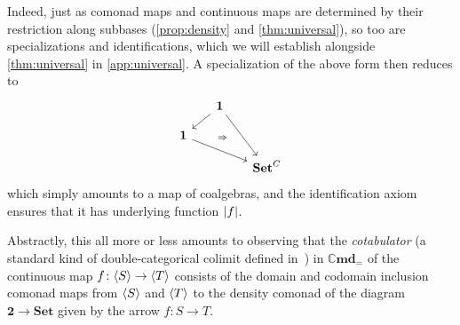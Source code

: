 \documentclass[11pt, oneside, article]{memoir}
\theoremstyle{plain}
\theoremstyle{definition}
\theoremstyle{remark}
\newenvironment{remark}
{\renewcommand\qedsymbol{$\lrcorner$}%
  \pushQED{\qed}\myremark}
{\popQED\endmyremark}
\DeclarePairedDelimiter{\gen}{\langle}{\rangle}
\DeclarePairedDelimiter{\abs}{\lvert}{\rvert}
\newcommand{\namedcat}[1]{\mathbf{#1}}
\newcommand{\Set}{\namedcat{Set}}
\newcommand{\Cmd}{\mathbb{C}\namedcat{md}}
\newcommand{\CmdId}{\Cmd_=}
\newcommand{\CmdIdSet}{\CmdId}
\newcommand{\CoalgOn}[2]{{#2}^{#1}}
\newcommand{\CoalgSet}[1]{\CoalgOn{#1}{\Set}}
\newcommand{\pts}[1]{{\abs{#1}}}
\newcommand{\one}[1]{\pts{#1}}
\newcommand{\point}{\mathbf{1}}
\newcommand{\arro}{\mathbf{2}}
\newcommand{\con}[2]{{#1}^{#2}}
\newcommand{\cmnd}[1]{{#1}}
\newcommand{\cC}{\cmnd{C}}
\newcommand{\CSet}{\CoalgSet{\cC}}
\newcommand{\anote}[1]{{\color{red!80!black}$\lozenge$\qquad Aaron says: #1\qquad$\lozenge$}}
\begin{document}
\begin{remark}

  Indeed, just as comonad maps and continuous maps are determined by
  their restriction along subbases (\cref{prop:density} and
  \cref{thm:universal}), so too are specializations and
  identifications, which we will establish alongside
  \cref{thm:universal} in \cref{app:universal}. A specialization of
  the above form then reduces to
  \[
    \begin{tikzcd}[column sep=15pt,row sep=10pt]
      & \point & \\
      \point \\
      && \CSet
      \arrow[""{name=0, anchor=center, inner sep=0}, from=1-2, to=2-1]
      \arrow[from=1-2, to=3-3]
      \arrow[from=2-1, to=3-3]
      \arrow["{\Rightarrow}"{anchor=center,pos=.45}, shift right=1pt, draw=none, from=0, to=3-3]
    \end{tikzcd}
  \]
  which simply amounts to a map of coalgebras, and the identification
  axiom ensures that it has underlying function $\one{f}$.

  Abstractly, this all more or less amounts to observing that the
  \emph{cotabulator} (a standard kind of double-categorical colimit
  defined in~\cite{grandis-pare:limits}) in $\CmdIdSet$ of the
  continuous map $f \colon \gen{S} \to \gen{T}$ consists of the domain
  and codomain inclusion comonad maps from $\gen{S}$ and $\gen{T}$ to
  the density comonad of the diagram $\arro \to \Set$ given by the
  arrow $f \colon S \to T$.
\end{remark}
\end{document}
